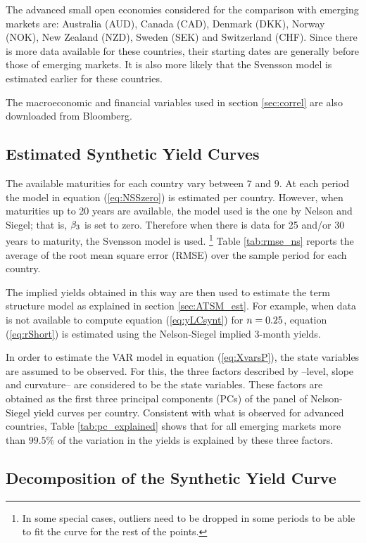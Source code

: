 The advanced small open economies considered for the comparison with emerging markets are: Australia (AUD), Canada (CAD), Denmark (DKK), Norway (NOK), New Zealand (NZD), Sweden (SEK) and Switzerland (CHF). Since there is more data available for these countries, their starting dates are generally before those of emerging markets. It is also more likely that the Svensson model is estimated earlier for these countries.

The macroeconomic and financial variables used in section \ref{sec:correl} are also downloaded from Bloomberg.

\subsection{Estimated Synthetic Yield Curves}
The available maturities for each country vary between $7$ and $9$. At each period the model in equation (\ref{eq:NSSzero}) is estimated per country. However, when maturities up to 20 years are available, the model used is the one by Nelson and Siegel; that is, $\beta_{3}$ is set to zero. Therefore when there is data for 25 and/or 30 years to maturity, the Svensson model is used. \footnote{In some special cases, outliers need to be dropped in some periods to be able to fit the curve for the rest of the points.} Table \ref{tab:rmse_ns} reports the average of the root mean square error (RMSE) over the sample period for each country.
	

The implied yields obtained in this way are then used to estimate the term structure model as explained in section \ref{sec:ATSM_est}. For example, when data is not available to compute equation (\ref{eq:yLCsynt}) for $n = 0.25$, equation (\ref{eq:rShort}) is estimated using the Nelson-Siegel implied 3-month yields.

In order to estimate the VAR model in equation (\ref{eq:XvarsP}), the state variables are assumed to be observed. For this, the three factors described by \cite{LittermanScheinkman:1991} --level, slope and curvature-- are considered to be the state variables. These factors are obtained as the first three principal components (PCs) of the panel of Nelson-Siegel yield curves per country. Consistent with what is observed for advanced countries, Table \ref{tab:pc_explained} shows that for all emerging markets more than $99.5\%$ of the variation in the yields is explained by these three factors.
	

\subsection{Decomposition of the Synthetic Yield Curve}


